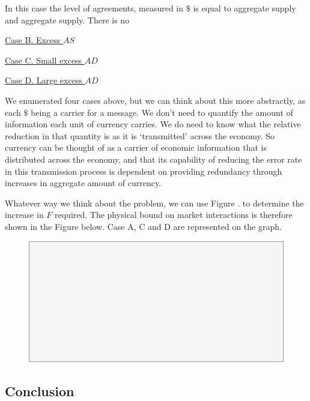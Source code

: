 In this case the level of agreements, measured in $\$$ is equal to aggregate supply and aggregate
supply. There is no  

\underline{Case B. Excess $AS$}

\underline{Case C. Small excess $AD$}

\underline{Case D. Large excess $AD$}

We enumerated four cases above, but we can think about this more abstractly, as each $\$$ being a
carrier for a message. We don't need to quantify the amount of information each unit of currency
carries. We do need to know what the relative reduction in that quantity is as it is `transmitted'
across the economy. So currency can be thought of as a carrier of economic information that is
distributed across the economy, and that its capability of reducing the error rate in this
transmission process is dependent on providing redundancy through increases in aggregate amount of
currency.

Whatever way we think about the problem, we can use Figure \label{fig:shannons_proof}. to determine the
increase in $F$ required. The physical bound on market interactions is therefore shown in the Figure
below. Case A, C and D are represented on the graph.

\begin{figure}[H]
\centering
\includegraphics[scale=0.48]{blank}
\caption{}
\label{fig:physical_bound}
\end{figure}



\subsection{Conclusion}

